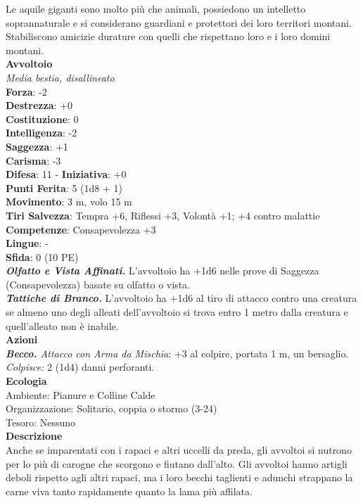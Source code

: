 \begin{multicols}{2}
Le aquile giganti sono molto più che animali, possiedono un intelletto soprannaturale e si considerano guardiani e protettori dei loro territori montani.\\

Stabiliscono amicizie durature con quelli che rispettano loro e i loro domini montani.\\

\medskip\textbf{Avvoltoio}\\
\emph{Media bestia, disallineato}\\
\textbf{Forza}: -2\\
\textbf{Destrezza}: +0\\
\textbf{Costituzione}: 0\\
\textbf{Intelligenza}: -2\\
\textbf{Saggezza}: +1\\
\textbf{Carisma}: -3\\
\textbf{Difesa}: 11 - \textbf{Iniziativa}: +0\\
\textbf{Punti Ferita}: 5 (1d8 + 1)\\
\textbf{Movimento}: 3 m, volo 15 m\\
\textbf{Tiri Salvezza}: Tempra +6, Riflessi +3, Volontà +1; +4 contro malattie\\
\textbf{Competenze}: Consapevolezza +3\\
\textbf{Lingue}: -\\
\textbf{Sfida}: 0 (10 PE)\smallskip\\
\emph{\textbf{Olfatto e Vista Affinati.}} L'avvoltoio ha +1d6 nelle prove di Saggezza (Consapevolezza) basate su olfatto o vista.\\
\emph{\textbf{Tattiche di Branco.}} L'avvoltoio ha +1d6 al tiro di attacco contro una creatura se almeno uno degli alleati dell'avvoltoio si trova entro 1 metro dalla creatura e quell'alleato non è inabile.\\
\smallskip\textbf{Azioni}\\
\emph{\textbf{Becco.} Attacco con Arma da Mischia}: +3 al colpire, portata 1 m, un bersaglio.\\
\emph{Colpisce:} 2 (1d4) danni perforanti.\\
\textbf{Ecologia}\\
Ambiente: Pianure e Colline Calde\\
Organizzazione: Solitario, coppia o stormo (3-24)\\
Tesoro: Nessuno\\
\textbf{Descrizione}\\
Anche se imparentati con i rapaci e altri uccelli da preda, gli avvoltoi si nutrono per lo più di carogne che scorgono e fiutano dall'alto. Gli avvoltoi hanno artigli deboli rispetto agli altri rapaci, ma i loro becchi taglienti e adunchi strappano la carne viva tanto rapidamente quanto la lama più affilata.\\


\end{multicols}
